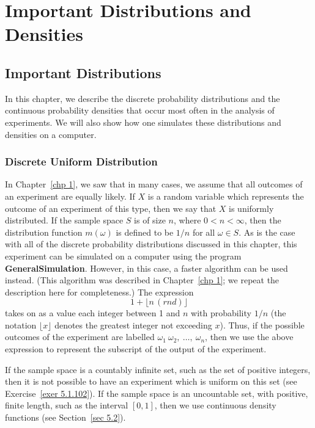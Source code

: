 {\chapter[Distributions and Densities]{Important Distributions and Densities}}\label{chp 5} 

\section{Important Distributions}\label{sec 5.1} 

In this chapter, we describe the discrete probability distributions and the continuous
probability densities that occur most often in the analysis of experiments.  We will
also show how one simulates these distributions and densities on a computer.

\subsection*{Discrete Uniform Distribution}

In Chapter~\ref{chp 1}, we saw that in many cases, we assume that all outcomes of an
experiment are equally likely.  If $X$ is a random variable which represents the
outcome of an experiment of this type, then we say that $X$ is uniformly distributed. 
If the sample space $S$ is of size $n$, where $0 < n < \infty$, then the distribution
function $m(\omega)$ is defined to be $1/n$ for all $\omega \in S$.  As is the case with 
all of the discrete probability distributions discussed in this chapter, this experiment 
can be simulated on a computer using the program {\bf GeneralSimulation}.  However, in
this case, a faster algorithm can be used instead.  (This algorithm was described in
Chapter~\ref{chp 1}; we repeat the description here for completeness.)  The expression
$$1 + \lfloor n\,(rnd)\rfloor$$ 
takes on as a value each integer between 1 and $n$ with probability $1/n$ 
(the notation $\lfloor x \rfloor$ denotes the greatest integer not exceeding $x$).  Thus, 
if the possible outcomes of the
experiment  are labelled $\omega_1\ \omega_2,\ \ldots,\ \omega_n$, then we use the above
expression to represent the subscript of the output of the experiment.
\par If the sample space is a countably infinite set, such as the set of positive
integers, then it  is not possible to have an experiment which is uniform on this set
(see Exercise~\ref{exer 5.1.102}).  If the sample space is an uncountable set, with
positive, finite length, such as
the interval $[0, 1]$, then we use continuous density functions (see Section~\ref{sec 5.2}).

